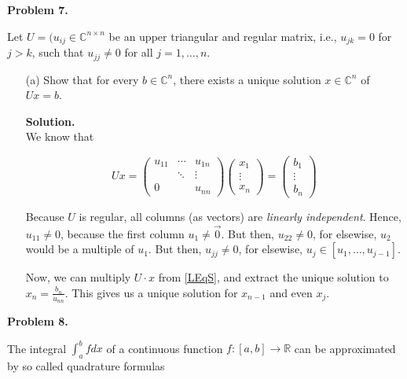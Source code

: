 \documentclass{article}
\begin{document}
\textbf{Problem 7.}

Let $U = (u_{ij} \in \mathbb{C}^{n \times n}$ be an upper triangular and regular matrix, i.e., $u_{jk} = 0$ for $j > k$, such that $u_{jj} \neq 0$ for all $j = 1, \ldots, n$.

\begin{itemize}
    \item[(a)] Show that for every $b \in \mathbb{C}^n$, there exists a unique solution $x \in \mathbb{C}^n$ of $Ux = b$.
    
    \textbf{Solution.} \\
    We know that
    
    \begin{equation} \label{LEqS}
        Ux =
        \begin{pmatrix}
            u_{11}  &   \cdots  &   u_{1n}  \\
                    &   \ddots  &   \vdots  \\
            0       &           &   u_{nn}
        \end{pmatrix}
        \begin{pmatrix}
            x_1     \\
            \vdots  \\
            x_n
        \end{pmatrix}
        =
        \begin{pmatrix}
            b_1     \\
            \vdots  \\
            b_n
        \end{pmatrix}
    \end{equation}
    
    Because $U$ is regular, all columns (as vectors) are \textit{linearly independent}. Hence, $u_{11} \neq 0$, because the first column $u_1 \neq \Vec{0}$.
    But then, $u_{22} \neq 0$, for elsewise, $u_2$ would be a multiple of $u_1$.
    But then, $u_{jj} \neq 0$, for elsewise, $u_j \in [u_1, \ldots, u_{j-1}]$.
    
    Now, we can multiply $U \cdot x$ from \eqref{LEqS}, and extract the unique solution to $x_n = \frac{b_n}{u_{nn}}$. This gives us a unique solution for $x_{n-1}$ and even $x_j$.
\end{itemize}

\textbf{Problem 8.}

The integral $\int_a^b f dx$ of a continuous function $f: [a, b] \rightarrow \mathbb{R}$ can be approximated by so called quadrature formulas
\end{document}
